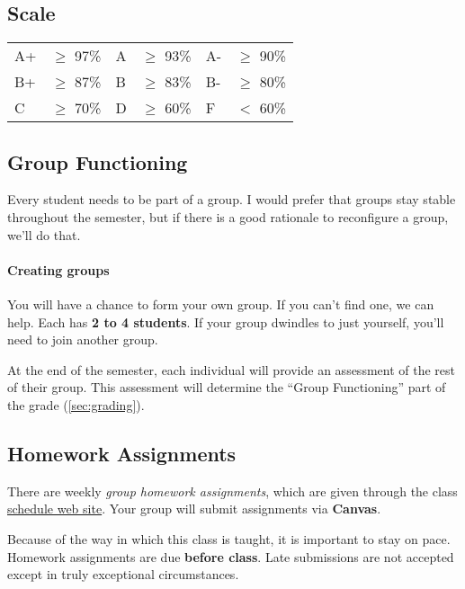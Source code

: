 \documentclass[11pt]{article}
\begin{document}
\subsection{Scale}\label{scale}

\begin{center}
    \begin{tabular}{ll|ll|ll}
    A+ & $\ge$ 97\% & A & $\ge$  93\% & A- & $\ge$
    90\% \\
    B+ & $\ge$  87\% & B & $\ge$  83\% & B- & $\ge$
    80\% \\
    C & $\ge$  70\% & D & $\ge$  60\% & F & $<$
    60\% \\
    \end{tabular}
    \end{center}

\subsection{Group Functioning}\label{group-functioning}

Every student needs to be part of a group. I would prefer that groups
stay stable throughout the semester, but if there is a good rationale to
reconfigure a group, we'll do that.



\paragraph{Creating groups} You will have a chance to form your own group.
If you can't find one, we can help. Each has  \textbf{2 to 4 students}. If your group dwindles to just yourself, you'll need to join another group.

At the end of the semester, each individual will provide an assessment
of the rest of their group. This assessment will determine the ``Group Functioning'' part of the grade (\autoref{sec:grading}).

\subsection{Homework Assignments}\label{homework-assignments}

There are weekly \emph{group homework assignments}, which are given through the class \href{https://nguyenthanhvuh.github.io/class-oo/assignments}{schedule web site}. Your group will submit assignments via \textbf{Canvas}.

Because of the way in which this class is taught, it is important to
stay on pace. Homework assignments are due \textbf{before class}. Late submissions
are not accepted except in truly exceptional circumstances.
\end{document}
